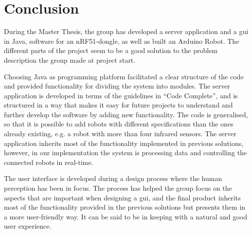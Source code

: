 \chapter{Conclusion}


During the Master Thesis, the group has developed a server application and a \acrlong{gui} in Java, software for an nRF51-dongle, as well as built an Arduino Robot. The different parts of the project seem to be a good solution to the problem description the group made at project start.

Choosing Java as programming platform facilitated a clear structure of the code and provided functionality for dividing the system into modules. The server application is developed in terms of the guidelines in ``Code Complete'', and is structured in a way that makes it easy for future projects to understand and further develop the software by adding new functionality. The code is generalised, so that it is possible to add robots with different specifications than the ones already existing, e.g. a robot with more than four infrared sensors. The server application inherits most of the functionality implemented in previous solutions, however, in our implementation the system is processing data and controlling the connected robots in real-time. 

The user interface is developed during a design process where the human perception has been in focus. The process has helped the group focus on the aspects that are important when designing a \acrshort{gui}, and the final product inherits most of the functionality provided in the previous solutions but presents them in a more user-friendly way. It can be said to be in keeping with a natural and good user experience.

